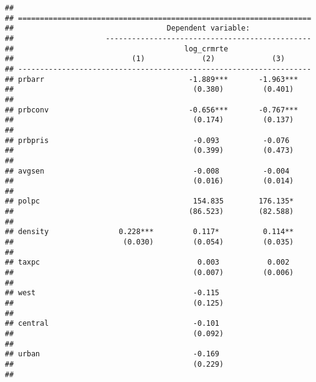 \documentclass[
]{article}
\begin{document}
\begin{verbatim}
## 
## ===================================================================
##                                   Dependent variable:              
##                     -----------------------------------------------
##                                       log_crmrte                   
##                           (1)             (2)             (3)      
## -------------------------------------------------------------------
## prbarr                                 -1.889***       -1.963***   
##                                         (0.380)         (0.401)    
##                                                                    
## prbconv                                -0.656***       -0.767***   
##                                         (0.174)         (0.137)    
##                                                                    
## prbpris                                 -0.093          -0.076     
##                                         (0.399)         (0.473)    
##                                                                    
## avgsen                                  -0.008          -0.004     
##                                         (0.016)         (0.014)    
##                                                                    
## polpc                                   154.835        176.135*    
##                                        (86.523)        (82.588)    
##                                                                    
## density                0.228***         0.117*          0.114**    
##                         (0.030)         (0.054)         (0.035)    
##                                                                    
## taxpc                                    0.003           0.002     
##                                         (0.007)         (0.006)    
##                                                                    
## west                                    -0.115                     
##                                         (0.125)                    
##                                                                    
## central                                 -0.101                     
##                                         (0.092)                    
##                                                                    
## urban                                   -0.169                     
##                                         (0.229)                    
##                                                                    

\end{verbatim}
\end{document}
